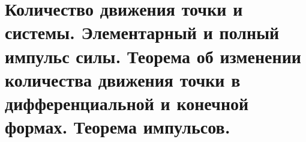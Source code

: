 \chapter{Количество движения точки и системы. Элементарный и полный импульс
силы. Теорема об изменении количества движения точки в дифференциальной и
конечной формах. Теорема импульсов.}

\newpage
